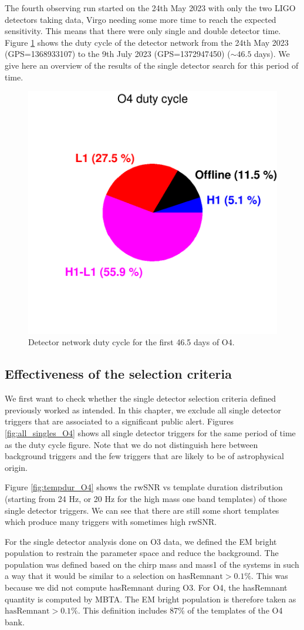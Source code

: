 The fourth observing run started on the 24th May 2023 with only the two LIGO detectors taking data, Virgo needing some more time to reach the expected sensitivity.
This means that there were only single and double detector time.
Figure \ref{fig:dc_O4} shows the duty cycle of the detector network from the 24th May 2023 (GPS=1368933107) to the 9th July 2023 (GPS=1372947450) ($\sim 46.5$ days).
We give here an overview of the results of the single detector search for this period of time.

\begin{figure}[hb]
  \centering
  \includegraphics[width=0.5\linewidth]{sectionO4/cDutyCycle.png}
  \caption{Detector network duty cycle for the first 46.5 days of O4.}
  \label{fig:dc_O4}
\end{figure}


\subsection{Effectiveness of the selection criteria}
We first want to check whether the single detector selection criteria defined previously worked as intended.
In this chapter, we exclude all single detector triggers that are associated to a significant public alert.
Figures \ref{fig:all_singles_O4} shows all single detector triggers for the same period of time as the duty cycle figure.
Note that we do not distinguish here between background triggers and the few triggers that are likely to be of astrophysical origin.

Figure \ref{fig:tempdur_O4} shows the rwSNR vs template duration distribution (starting from 24 Hz, or 20 Hz for the high mass one band templates) of those single detector triggers.
We can see that there are still some short templates which produce many triggers with sometimes high rwSNR.

For the single detector analysis done on O3 data, we defined the EM bright population to restrain the parameter space and reduce the background.
The population was defined based on the chirp mass and mass1 of the systems in such a way that it would be similar to a selection on $\text{hasRemnant}>0.1\%$.
This was because we did not compute hasRemnant during O3.
For O4, the hasRemnant quantity is computed by MBTA.
The EM bright population is therefore taken as $\text{hasRemnant}>0.1\%$.
This definition includes 87\% of the templates of the O4 bank.

